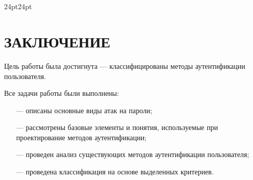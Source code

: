 \titlespacing\section{\parindent}{24pt}{24pt}
\section*{\hfill{\centering\normalsize ЗАКЛЮЧЕНИЕ}\hfill}
Цель работы была достигнута --- классифицированы методы аутентификации пользователя.

Все задачи работы были выполнены:
\begin{itemize}
    \item [---] описаны основные виды атак на пароли;
    \item [---] рассмотрены базовые элементы и понятия, используемые при проектирование методов аутентификации;
    \item [---] проведен анализ существующих методов аутентификации пользователя;
    \item [---] проведена классификация на основе выделенных критериев.
\end{itemize}